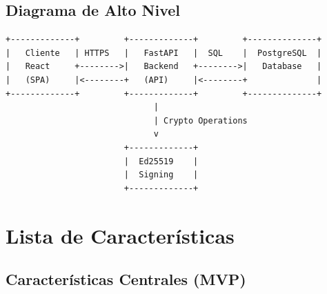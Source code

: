 \documentclass[12pt,a4paper]{article}
\begin{document}
\subsection{Diagrama de Alto Nivel}

\begin{verbatim}
+-------------+         +-------------+         +--------------+
|   Cliente   | HTTPS   |   FastAPI   |  SQL    |  PostgreSQL  |
|   React     +-------->|   Backend   +-------->|   Database   |
|   (SPA)     |<--------+   (API)     |<--------+              |
+-------------+         +-------------+         +--------------+
                              |
                              | Crypto Operations
                              v
                        +-------------+
                        |  Ed25519    |
                        |  Signing    |
                        +-------------+
\end{verbatim}

\section{Lista de Características}

\subsection{Características Centrales (MVP)}
\end{document}
